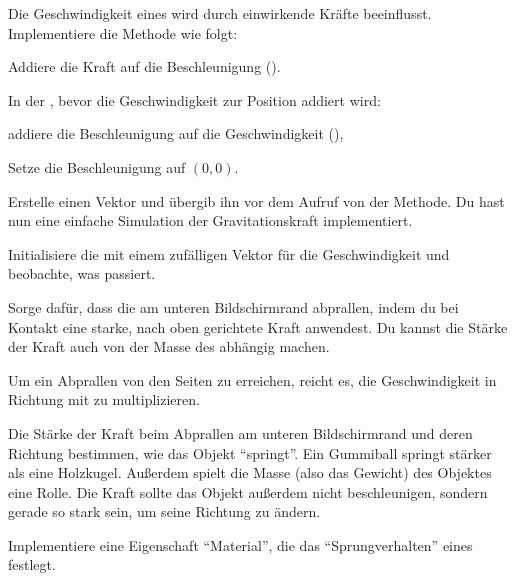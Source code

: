 \documentclass[9pt, a4paper, ngerman]{arbeitsblatt}
\begin{document}
\begin{aufgabe}[subtitle=Gravitation,icon=\iconComputer]
\begin{enuma}
{	}
	\item
	Die Geschwindigkeit eines  wird durch einwirkende Kräfte beeinflusst. Implementiere die Methode  wie folgt:
	\begin{smallitem}
		\item Addiere die Kraft  auf die Beschleunigung ().
		\item In der , bevor die Geschwindigkeit zur Position addiert wird:
		\begin{smallitem}
			\item addiere die Beschleunigung auf die Geschwindigkeit (),
			\item Setze die Beschleunigung auf $(0,0)$.
		\end{smallitem}
	\end{smallitem}
	\item
	Erstelle einen Vektor  und übergib ihn vor dem Aufruf von  der  Methode. Du hast nun eine einfache Simulation der Gravitationskraft implementiert.
	\item
	Initialisiere die  mit einem zufälligen Vektor für die Geschwindigkeit und beobachte, was passiert.
\end{enuma}
\begin{enuma}[resume]
	\item
	Sorge dafür, dass die  am unteren Bildschirmrand abprallen, indem du bei Kontakt eine starke, nach oben gerichtete Kraft anwendest. Du kannst die Stärke der Kraft auch von der Masse des  abhängig machen.

	Um ein Abprallen von den Seiten zu erreichen, reicht es, die Geschwindigkeit in  Richtung mit  zu multiplizieren.
	\item
	Die Stärke der Kraft beim Abprallen am unteren Bildschirmrand und deren Richtung bestimmen, wie das Objekt \enquote{springt}. Ein Gummiball springt stärker als eine Holzkugel. Außerdem spielt die Masse (also das Gewicht) des Objektes eine Rolle. Die Kraft sollte das Objekt außerdem nicht beschleunigen, sondern gerade so stark sein, um seine Richtung zu ändern.

	Implementiere eine Eigenschaft \enquote{Material}, die das \enquote{Sprungverhalten} eines  festlegt.
\end{enuma}
\end{aufgabe}
\end{document}
